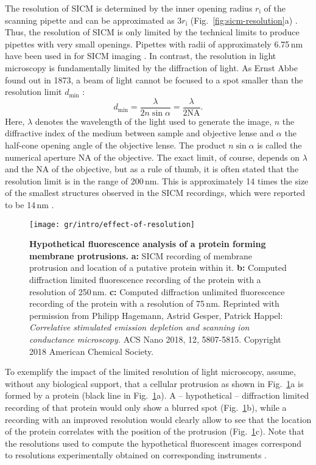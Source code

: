 The resolution of SICM is determined by the inner opening radius
$r_\mathrm{i}$ of the scanning pipette and can be approximated as
$3r_\mathrm{i}$ (Fig.~\ref{fig:sicm-resolution}a)
\cite{rheinlaender:094905,Rheinlaender2015}. Thus, the resolution of SICM is
only limited by the technical limits to produce pipettes with very small
openings. Pipettes with radii of approximately 6.75\,nm have been used in for
SICM imaging \cite{Shevchuk2006}. In
contrast, the resolution in light microscopy is fundamentally limited by the
diffraction of light. As Ernst Abbe found out in 1873, a beam of light cannot
be focused to a spot smaller than the resolution limit $d_\text{min}$
\cite{Abbe1873}:
\begin{equation}
  d_\text{min} = \frac\lambda{2n\sin\alpha} = \frac\lambda{2\mathrm{NA}}\text{.}
  \label{eq:diffraction-limit}
\end{equation}
Here, $\lambda$ denotes the wavelength of the light used to generate the
image, $n$ the diffractive index of the medium between sample and objective
lense and $\alpha$ the half-cone opening angle of the objective lense. The
product $n\sin\alpha$ is called the numerical aperture $\mathrm{NA}$ of the
objective. The exact limit, of course, depends on $\lambda$ and the NA of the
objective, but as a rule of thumb, it is often stated that the resolution
limit is in the range of 200\,nm. This is approximately 14 times the size of
the smallest structures observed in the SICM recordings, which were reported to be 14\,nm
\cite{Shevchuk2006}.

\begin{figure}
  \centering
  \texttt{[image: gr/intro/effect-of-resolution]}%
  \caption{\textbf{Hypothetical fluorescence analysis of a protein forming
      membrane protrusions.} \textbf{a:} SICM recording of membrane protrusion
    and location of a putative protein within it. \textbf{b:} Computed
    diffraction limited fluorescence recording of the protein with a
    resolution of 250\,nm. \textbf{c:} Computed diffraction unlimited
    fluorescence recording of the protein with a resolution of 75\,nm.
    Reprinted with permission from Philipp Hagemann, Astrid Gesper, Patrick
    Happel: \emph{Correlative stimulated emission depletion and scanning ion
      conductance microscopy.} ACS Nano 2018, 12, 5807-5815. Copyright 2018
    American Chemical Society.}
  \label{fig:sicm-and-light-resolution}
\end{figure}

To exemplify the impact of the limited resolution of light microscopy, assume,
without any biological support, that a cellular protrusion as shown in
Fig.~\ref{fig:sicm-and-light-resolution}a is formed by a protein (black line
in Fig.~\ref{fig:sicm-and-light-resolution}a). A -- hypothetical --
diffraction limited recording of that protein would only show a blurred spot
(Fig.~\ref{fig:sicm-and-light-resolution}b), while a recording with an
improved resolution would clearly allow to see that the location of the
protein correlates with the position of the protrusion
(Fig.~\ref{fig:sicm-and-light-resolution}c). Note that the resolutions used to
compute the hypothetical fluorescent images correspond to resolutions
experimentally obtained on corresponding instruments \cite{Hagemann2018}. 

